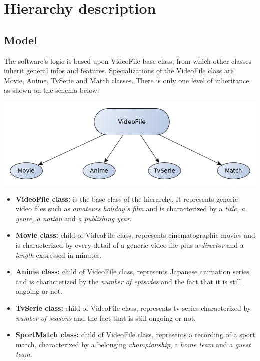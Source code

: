 \section{Hierarchy description}

\subsection{Model}

The software's logic is based upon VideoFile base class, from which other classes inherit general infos and features. Specializations of the VideoFile class are Movie, Anime, TvSerie and Match classes. There is only one level of inheritance as shown on the schema below: \\

\begin{center}
\includegraphics[scale=0.65]{Img/Hierarchy.png}
\end{center}

\begin{itemize}
\item \textbf{VideoFile class:} is the base class of the hierarchy. It represents generic video files such as \emph{amateurs holiday's film} and is characterized by a \emph{title, a genre, a nation} and \emph{a publishing year}.
\item \textbf{Movie class:} child of VideoFile class, represents cinematographic movies and is characterized by every detail of a generic video file plus a \emph{director} and a \emph{length} expressed in minutes.
\item \textbf{Anime class:} child of VideoFile class, represents Japanese animation series and is characterized by the \emph{number of episodes} and the fact that it is still ongoing  or not.
\item \textbf{TvSerie class:} child of VideoFile class, represents tv series characterized by \emph{number of seasons} and the fact that is still ongoing or not.
\item \textbf{SportMatch class:} child of VideoFile class, represents a recording of a sport match, characterized by a belonging \emph{championship}, a \emph{home team} and a \emph{guest team}.
\end{itemize}

